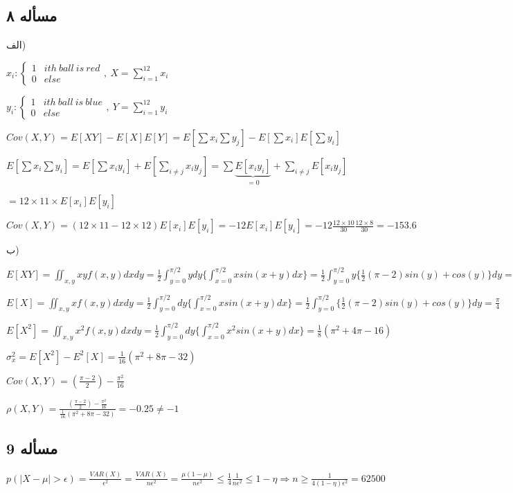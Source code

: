 \documentclass[12pt]{article}
\begin{document}
\subsection*{مسأله‌ ۸}
الف)
\begin{flushleft}
$x_i:\begin{cases} 
      1 & ith\ ball\ is\ red \\
      0 & else
   \end{cases},\ 
X=\sum_{i=1}^{12}{x_i} \ $

$y_i:\begin{cases} 
      1 & ith\ ball\ is\ blue \\
      0 & else
   \end{cases},\ 
Y=\sum_{i=1}^{12}{y_i} \ $


$Cov(X,Y)=E[XY]-E[X]E[Y]=E[\sum x_i \sum y_j]-E[\sum x_i]E[\sum y_i]$

$E[\sum x_i\sum y_i]=E[\sum x_iy_i]+E[\sum_{i\neq j}x_iy_j]=\sum \underbrace{E[x_iy_i]}_{=0}+\sum_{i\neq j}E[x_iy_j]$

$=12\times11\times E[x_i]E[y_i]$

$ Cov(X,Y)=(12\times 11-12\times 12)E[x_i]E[y_i]=-12E[x_i]E[y_i]=-12\frac{12\times10}{30}\frac{12\times8}{30}=\boxed{-153.6}$
\end{flushleft}
ب)
\begin{flushleft}
$E[XY]=\iint_{x,y}xyf(x,y)dx dy=\frac{1}{2}\int_{y=0}^{\pi/2}ydy\{\int_{x=0}^{\pi/2}xsin(x+y)dx\}=
\frac{1}{2}\int_{y=0}^{\pi/2}y\{\frac{1}{2}(\pi-2)sin(y)+cos(y)\}dy=
\frac{\pi-2}{2}$

$E[X]=\iint_{x,y}xf(x,y)dx dy=\frac{1}{2}\int_{y=0}^{\pi/2}dy\{\int_{x=0}^{\pi/2}xsin(x+y)dx\}=
\frac{1}{2}\int_{y=0}^{\pi/2}\{\frac{1}{2}(\pi-2)sin(y)+cos(y)\}dy=
\frac{\pi}{4}$

$E[X^2]=\iint_{x,y}x^2f(x,y)dx dy=\frac{1}{2}\int_{y=0}^{\pi/2}dy\{\int_{x=0}^{\pi/2}x^2sin(x+y)dx\}=
\frac{1}{8}(\pi^2+4\pi-16)$

$\sigma_x^2=E[X^2]-E^2[X]=\frac{1}{16}(\pi^2+8\pi-32)$

$Cov(X,Y)=(\frac{\pi-2}{2})-\frac{\pi^2}{16}$

$\rho(X,Y)=\frac{(\frac{\pi-2}{2})-\frac{\pi^2}{16}}{\frac{1}{16}(\pi^2+8\pi-32)}=-0.25\neq -1$

\end{flushleft}
\subsection*{مسأله ‌9}
\begin{flushleft}
$p(|X- \mu |> \epsilon)=\frac{VAR(X)}{\epsilon^2}=\frac{VAR(X)}{n\epsilon^2}=\frac{\mu (1-\mu)}{n\epsilon^2}\leq \frac{1}{4} \frac{1}{n\epsilon^2} \leq 1-\eta\Rightarrow n\geq \frac{1}{4(1-\eta)\epsilon^2}=62500$
\end{flushleft}
\end{document}

